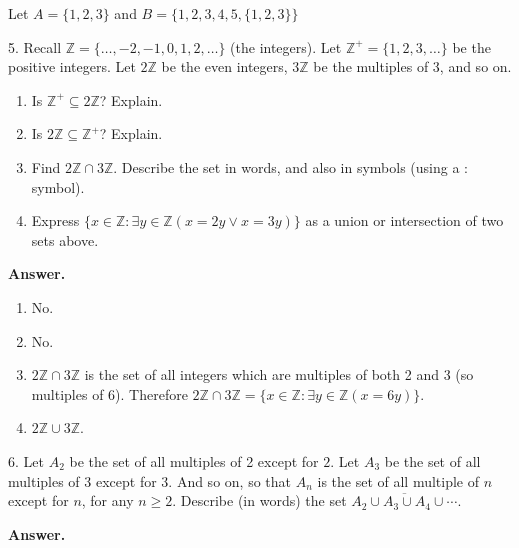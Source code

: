 \documentclass[10pt,]{book}
\theoremstyle{plain}
\theoremstyle{definition}
\theoremstyle{definition}
\theoremstyle{definition}
\numberwithin{equation}{section}
\def\Z{\mathbb Z}
\def\st{:}
\def\bar{\overline}
\begin{document}
\begin{exerciselist}
            Let \(A = \{1,2,3\}\) and \(B = \{1,2,3,4,5,\{1,2,3\}\}\)
\item[5.]\hypertarget{exercise-5}{}
            Recall \(\Z = \{\ldots,-2,-1,0, 1,2,\ldots\}\) (the integers). Let \(\Z^+ = \{1, 2, 3, \ldots\}\) be the positive integers. Let \(2\Z\) be the even integers, \(3\Z\) be the multiples of 3, and so on.
\leavevmode%
\begin{enumerate}[label=(\alph*)]
\item\hypertarget{li-140}{}
                Is \(\Z^+ \subseteq 2\Z\)? Explain.
\item\hypertarget{li-141}{}
                Is \(2\Z \subseteq \Z^+\)? Explain.
\item\hypertarget{li-142}{}
                Find \(2\Z \cap 3\Z\). Describe the set in words, and also in symbols (using a \(\st\) symbol).
\item\hypertarget{li-143}{}
                Express \(\{x \in \Z \st \exists y\in \Z (x = 2y \vee x = 3y)\}\) as a union or intersection of two sets above.
\end{enumerate}
\par\smallskip
\par\smallskip
\noindent\textbf{Answer.}\hypertarget{answer-5}{}\quad
\leavevmode%
\begin{enumerate}[label=(\alph*)]
\item\hypertarget{li-144}{}
                No.
\item\hypertarget{li-145}{}
                No.
\item\hypertarget{li-146}{}\(2\Z \cap 3\Z\) is the set of all integers which are multiples of both 2 and 3 (so multiples of 6). Therefore \(2\Z \cap 3\Z = \{x \in \Z \st \exists y\in \Z(x = 6y)\}\).\item\hypertarget{li-147}{}\(2\Z \cup 3\Z\).\end{enumerate}
\item[6.]\hypertarget{exercise-6}{}
            Let \(A_2\) be the set of all multiples of 2 except for \(2\). Let \(A_3\) be the set of all multiples of 3 except for 3. And so on, so that \(A_n\) is the set of all multiple of \(n\) except for \(n\), for any \(n \ge 2\).
            Describe (in words) the set \(\bar{A_2 \cup A_3 \cup A_4 \cup \cdots}\).
\par\smallskip
\par\smallskip
\noindent\textbf{Answer.}\hypertarget{answer-6}{}\quad


\end{exerciselist}
\end{document}
